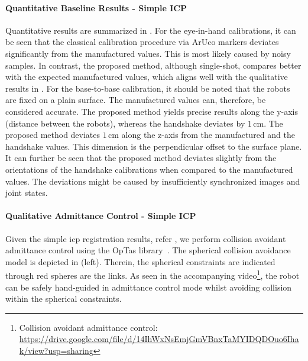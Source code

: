 \paragraph{Quantitative Baseline Results - Simple ICP} Quantitative results are summarized in . For the eye-in-hand calibrations, it can be seen that the classical calibration procedure via ArUco markers deviates significantly from the manufactured values. This is most likely caused by noisy samples. In contrast, the proposed method, although single-shot, compares better with the expected manufactured values, which aligns well with the qualitative results in . For the base-to-base calibration, it should be noted that the robots are fixed on a plain surface. The manufactured values can, therefore, be considered accurate. The proposed method yields precise results along the y-axis (distance between the robots), whereas the handshake deviates by $1\,\text{cm}$. The proposed method deviates $1\,\text{cm}$ along the z-axis from the manufactured and the handshake values. This dimension is the perpendicular offset to the surface plane. It can further be seen that the proposed method deviates slightly from the orientations of the handshake calibrations when compared to the manufactured values. The deviations might be caused by insufficiently synchronized images and joint states.

\paragraph{Qualitative Admittance Control - Simple ICP} Given the simple \gls{icp} registration results, refer , we perform collision avoidant admittance control using the OpTas library~\cite{optas}. The spherical collision avoidance model is depicted in  (left). Therein, the spherical constraints are indicated through red spheres are the links. As seen in the accompanying video\footnote[1]{Collision avoidant admittance control: \url{https://drive.google.com/file/d/14IhWxNsEmjGmVBnxTaMYIDQDOuo6Ihak/view?usp=sharing}}, the robot can be safely hand-guided in admittance control mode whilst avoiding collision within the spherical constraints.


